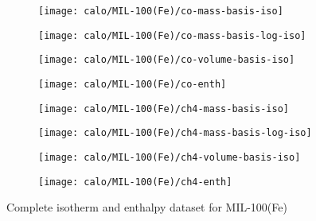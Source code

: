 \begin{figure}[H]
    \begin{subfigure}{0.25\textwidth}
        \texttt{[image: calo/MIL-100(Fe)/co-mass-basis-iso]}%
        \label{appx:fig:shaping:mil100comass}
    \end{subfigure}%
    \begin{subfigure}{0.25\textwidth}
        \texttt{[image: calo/MIL-100(Fe)/co-mass-basis-log-iso]}%
        \label{appx:fig:shaping:mil100comasslog}
    \end{subfigure}%
    \begin{subfigure}{0.25\textwidth}
        \texttt{[image: calo/MIL-100(Fe)/co-volume-basis-iso]}%
        \label{appx:fig:shaping:mil100covolume}
    \end{subfigure}%
    \begin{subfigure}{0.25\textwidth}
        \texttt{[image: calo/MIL-100(Fe)/co-enth]}%
        \label{appx:fig:shaping:mil100coenth}
    \end{subfigure}%


    \begin{subfigure}{0.25\textwidth}
        \texttt{[image: calo/MIL-100(Fe)/ch4-mass-basis-iso]}%
        \label{appx:fig:shaping:mil100ch4mass}
    \end{subfigure}%
    \begin{subfigure}{0.25\textwidth}
        \texttt{[image: calo/MIL-100(Fe)/ch4-mass-basis-log-iso]}%
        \label{appx:fig:shaping:mil100ch4masslog}
    \end{subfigure}%
    \begin{subfigure}{0.25\textwidth}
        \texttt{[image: calo/MIL-100(Fe)/ch4-volume-basis-iso]}%
        \label{appx:fig:shaping:mil100ch4volume}
    \end{subfigure}%
    \begin{subfigure}{0.25\textwidth}
        \texttt{[image: calo/MIL-100(Fe)/ch4-enth]}%
        \label{appx:fig:shaping:mil100ch4enth}
    \end{subfigure}%

    \caption{Complete isotherm and enthalpy dataset for MIL-100(Fe)}
    
\end{figure}

